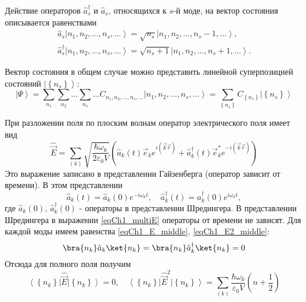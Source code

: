 Действие операторов $\hat{a}_s^{\dag}$ и $\hat{a}_s$,  относящихся к $s$-й
моде, на вектор состояния описывается равенствами 
\begin{eqnarray}
\hat{a}_s \left| n_1, n_2, \dots, n_s, \dots\right> = \sqrt{n_s} \left|
n_1, n_2, \dots, n_s - 1, \dots\right>,
\nonumber \\
\hat{a}_s^{\dag} \left| n_1, n_2, \dots, n_s, \dots\right> = \sqrt{n_s + 1} \left|
n_1, n_2, \dots, n_s + 1, \dots\right>.
\end{eqnarray} 

Вектор состояния в общем случае можно представить линейной
суперпозицией состояний  $\left| \left\{n_s\right\}\right>$: 
\begin{equation}
\left|\Psi\right> = \sum_{n_1}\sum_{n_2}\dots\sum_{n_s}\dots
C_{n_1, n_2, \dots, n_s, \dots} \left| n_1, n_2, \dots, n_s,
\dots\right>= 
\sum_{\left\{n_s\right\}} C_{\left\{n_s\right\}} \left| \left\{n_s\right\}\right>
\end{equation}

При разложении поля по плоским волнам оператор электрического поля 
имеет вид
\begin{equation}
\hat{\vec{E}} = \sum_{(k)} \sqrt{\frac{\hbar \omega_k}{2 \varepsilon_0
V}} \left( 
\hat{a}_k\left(t\right) \vec{e}_k e^{i \left(\vec{k}\vec{r} \right)} +
\hat{a}_k^{\dag}\left(t\right) \vec{e}_k^{*} e^{-i \left(\vec{k}\vec{r} \right)}
\right)
\label{eqCh1_multiE}
\end{equation}
Это выражение записано в представлении Гайзенберга (оператор зависит
от времени). В этом представлении 
\[
\hat{a}_k\left(t\right) = \hat{a}_k\left(0\right) e^{-i \omega_k t},
\quad
\hat{a}_k^{\dag}\left(t\right) = \hat{a}_k^{\dag}\left(0\right) e^{i \omega_k t},
\]
где $\hat{a}_k\left(0\right)$, $\hat{a}_k^{\dag}\left(0\right)$ -
операторы в представлении Шредингера. В представлении Шредингера в
выражении \eqref{eqCh1_multiE} операторы от времени не зависят.
Для каждой моды имеем 
равенства \eqref{eqCh1_E_middle}, \eqref{eqCh1_E2_middle}: 
\[
\bra{n_k}\hat{a}_k\ket{n_k} = 
\bra{n_k}\hat{a}^{\dag}_k\ket{n_k} = 0
\]
Отсюда для полного поля получим
\begin{equation}
\left<\left\{n_k\right\}\right|\hat{\vec{E}}\left|\left\{n_k\right\}\right>
= 0, \quad
\left<\left\{n_k\right\}\right|\hat{\vec{E}}^2\left|\left\{n_k\right\}\right>
= \sum_{(k)}\frac{\hbar \omega_k}{\varepsilon_0 V}
\left(n + \frac{1}{2} \right)
\end{equation}

